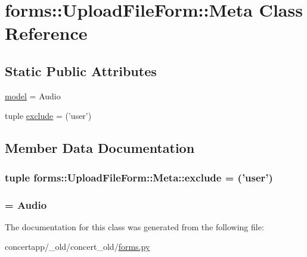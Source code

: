 \hypertarget{classforms_1_1_upload_file_form_1_1_meta}{
\section{forms::UploadFileForm::Meta Class Reference}
\label{classforms_1_1_upload_file_form_1_1_meta}
}
\subsection*{Static Public Attributes}
\begin{DoxyCompactItemize}
\item 
\hyperlink{classforms_1_1_upload_file_form_1_1_meta_aaca66080aeaded13886a86c3588358da}{model} = Audio
\item 
tuple \hyperlink{classforms_1_1_upload_file_form_1_1_meta_a69a70ad914ab902a717c14169bc20eba}{exclude} = ('user')
\end{DoxyCompactItemize}


\subsection{Member Data Documentation}
\hypertarget{classforms_1_1_upload_file_form_1_1_meta_a69a70ad914ab902a717c14169bc20eba}{
\subsubsection[{exclude}]{\setlength{\rightskip}{0pt plus 5cm}tuple {\bf forms::UploadFileForm::Meta::exclude} = ('user')}}
\label{classforms_1_1_upload_file_form_1_1_meta_a69a70ad914ab902a717c14169bc20eba}
\hypertarget{classforms_1_1_upload_file_form_1_1_meta_aaca66080aeaded13886a86c3588358da}{
\subsubsection[{model}]{ = Audio}}
\label{classforms_1_1_upload_file_form_1_1_meta_aaca66080aeaded13886a86c3588358da}


The documentation for this class was generated from the following file:\begin{DoxyCompactItemize}
\item 
concertapp/\_\-old/concert\_\-old/\hyperlink{__old_2concert__old_2forms_8py}{forms.py}\end{DoxyCompactItemize}
